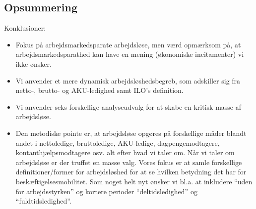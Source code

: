

\subsection{Opsummering \label{}}

Konklusioner:
%
 \begin{itemize} [topsep=6pt,itemsep=-1ex]
	\item Fokus på arbejdsmarkedsparate arbejdsløse, men værd opmærksom på, at arbejdsmarkedsparathed kan have en mening (økonomiske incitamenter) vi ikke ønsker.
   \item Vi anvender et mere dynamisk arbejdsløshedsbegreb, som adskiller sig fra netto-, brutto- og AKU-ledighed samt ILO's definition.
   \item Vi anvender seks forskellige analyseudvalg for at skabe en kritisk masse af arbejdsløse.
   \item Den metodiske pointe er, at arbejdsløse opgøres på forskellige måder blandt andet i nettoledige, bruttoledige, AKU-ledige, dagpengemodtagere, kontanthjælpsmodtagere osv. alt efter hvad vi taler om. Når vi taler om arbejdsløse er der truffet en masse valg. Vores fokus er at samle forskellige definitioner/former for arbejdsløshed for at se hvilken betydning det har for beskæftigelsesmobilitet. Som noget helt nyt ønsker vi bl.a. at inkludere “uden for arbejdsstyrken” og kortere perioder “deltidsledighed” og “fuldtidsledighed”. 
 \end{itemize}
%






